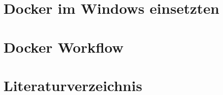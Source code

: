 \documentclass[
10pt, %
a4paper, %
BCOR15mm, %
DIV14, %
footsepline = false, %
headsepline, %
oneside,
openright,
parskip=half, %
abstracton, %
listof=totocnumbered, %
bibliography=totocnumbered %
]{scrreprt}
\begin{document}
\chapter{Docker im Windows einsetzten}\label{chapter:Docker im Windows einsetzten}



\cleardoublepage

  
\chapter{Docker Workflow}\label{chapter:DockerWorkflow}
  


\cleardoublepage


\appendix



\begingroup
\let\clearpage\relax
\listoffigures
\endgroup

\renewcommand{\lstlistlistingname}{Listingverzeichnis}

\begingroup
\let\clearpage\relax
\lstlistoflistings
\endgroup

\cleardoublepage

  
\chapter{Literaturverzeichnis}\label{chapter:Literaturverzeichnis}



\cleardoublepage
\end{document}
